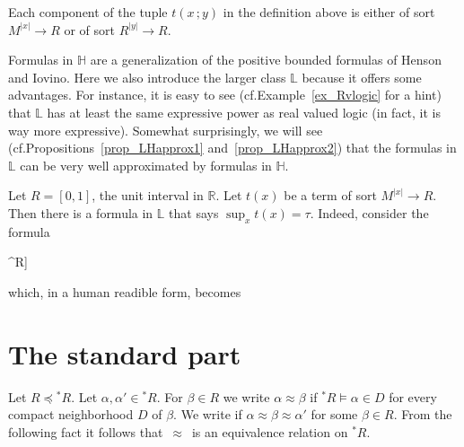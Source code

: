 \documentclass[11pt,oneside]{amsart}
\renewcommand*{\emph}[1]{%
   \smash{\tikz[baseline]\node[rectangle, fill=teal!25, rounded corners, inner xsep=0.5ex, inner ysep=0.2ex, anchor=base, minimum height = 2.7ex]{#1};}}
\begin{document}
\begin{remark}\label{rk_terms}
  Each component of the tuple $t(x\,;y)$ in the definition above is either of sort $M^{|x|}\to R$ or of sort $R^{|y|}\to R$.
\end{remark}

\noindent\llap{\textcolor{red}{\Large\dangersign}\kern1ex}\ignorespaces
Formulas in $\mathds{H}$ are a generalization of the positive bounded formulas of Henson and Iovino.
Here we also introduce the larger class $\mathds{L}$ because it offers some advantages. 
For instance, it is easy to see (cf.\@ Example~\ref{ex_Rvlogic} for a hint) that $\mathds{L}$ has at least the same expressive power as real valued logic (in fact, it is way more expressive).
Somewhat surprisingly, we will see (cf.\@ Propositions~\ref{prop_LHapprox1} and~\ref{prop_LHapprox2}) that the formulas in $\mathds{L}$ can be very well approximated by formulas in $\mathds{H}$.

\begin{example}\label{ex_Rvlogic}
  Let $R=[0,1]$, the unit interval in $\mathds{R}$.
  Let $t(x)$ be a term of sort $M^{|x|}\to R$.
  Then there is a formula in $\mathds{L}$ that says $\sup_{x} t(x)=\tau$.
  Indeed, consider the formula

  {\wedge}{\forall^R\varepsilon \Big[\varepsilon\in\{0\}\ \vee\ \exists x\ \big[\tau\dotminus (t(x)+\varepsilon)\in\{0\}\big]\Big]}

  which, in a human readible form, becomes

\end{example}

\section{The standard part}

Let $R\preceq{}^*\!R$.
Let $\alpha,\alpha'\in{}^*\! R$.
For $\beta\in R$ we write $\alpha\approx\beta$ if $^*\!R\models\alpha\in D$ for every compact neighborhood $D$ of $\beta$.
We write \emph{$\alpha\approx\alpha'$\/} if $\alpha\approx\beta\approx\alpha'$ for some $\beta\in R$.
From the following fact it follows that $\,\approx\,$ is an equivalence relation on ${}^*\!R$.
\end{document}
